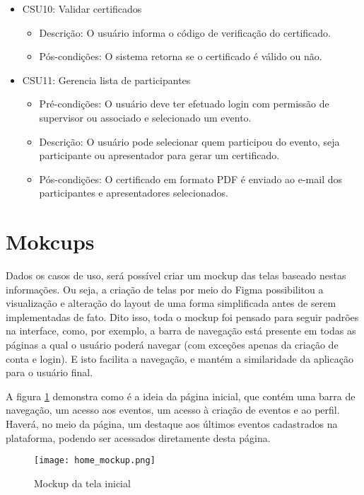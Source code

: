 \begin{itemize}
\begin{itemize}
        \end{itemize}
    \item CSU10: Validar certificados
        \begin{itemize}
            \item Descrição: O usuário informa o código de verificação do certificado.
            \item Pós-condições: O sistema retorna se o certificado é válido ou não.
        \end{itemize}
    \item CSU11: Gerencia lista de participantes
        \begin{itemize}
            \item Pré-condições: O usuário deve ter efetuado login com permissão de supervisor ou associado e selecionado um evento.
            \item Descrição: O usuário pode selecionar quem participou do evento, seja participante ou apresentador para gerar um certificado.
            \item Pós-condições: O certificado em formato PDF é enviado ao e-mail dos participantes e apresentadores selecionados.
        \end{itemize}
        
\end{itemize}

\section{Mokcups}
Dados os casos de uso, será possível criar um mockup das telas baseado nestas informações. Ou seja, a criação de telas por meio do Figma possibilitou a visualização e alteração do layout de uma forma simplificada antes de serem implementadas de fato. Dito isso, toda o mockup foi pensado para seguir padrões na interface, como, por exemplo, a barra de navegação está presente em todas as páginas a qual o usuário poderá navegar (com exceções apenas da criação de conta e login). E isto facilita a navegação, e mantém a similaridade da aplicação para o usuário final.  

A figura \ref{home_mockup} demonstra como é a ideia da página inicial, que contém uma barra de navegação, um acesso aos eventos, um acesso à criação de eventos e ao perfil. Haverá, no meio da página, um destaque aos últimos eventos cadastrados na plataforma, podendo ser acessados diretamente desta página.
\begin{figure}[H]
    \caption{\label{home_mockup}Mockup da tela inicial}
    \vspace{5pt}
    \centering
    \texttt{[image: home\_mockup.png]}
    \vspace{5pt}
\end{figure}

